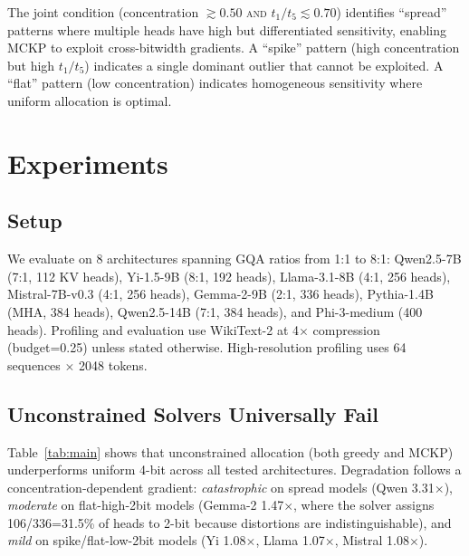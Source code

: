 \documentclass[11pt,a4paper]{article}
\begin{document}
The joint condition (concentration $\gtrsim 0.50$ \textsc{and} $t_1/t_5 \lesssim 0.70$) identifies ``spread'' patterns where multiple heads have high but differentiated sensitivity, enabling MCKP to exploit cross-bitwidth gradients.
A ``spike'' pattern (high concentration but high $t_1/t_5$) indicates a single dominant outlier that cannot be exploited.
A ``flat'' pattern (low concentration) indicates homogeneous sensitivity where uniform allocation is optimal.

\section{Experiments}
\label{sec:experiments}

\subsection{Setup}

We evaluate on 8 architectures spanning GQA ratios from 1:1 to 8:1: Qwen2.5-7B (7:1, 112 KV heads), Yi-1.5-9B (8:1, 192 heads), Llama-3.1-8B (4:1, 256 heads), Mistral-7B-v0.3 (4:1, 256 heads), Gemma-2-9B (2:1, 336 heads), Pythia-1.4B (MHA, 384 heads), Qwen2.5-14B (7:1, 384 heads), and Phi-3-medium (400 heads).
Profiling and evaluation use WikiText-2 at 4$\times$ compression (budget=0.25) unless stated otherwise.
High-resolution profiling uses 64 sequences $\times$ 2048 tokens.

\subsection{Unconstrained Solvers Universally Fail}
\label{sec:unconstrained}

Table~\ref{tab:main} shows that unconstrained allocation (both greedy and MCKP) underperforms uniform 4-bit across all tested architectures.
Degradation follows a concentration-dependent gradient:
\emph{catastrophic} on spread models (Qwen 3.31$\times$),
\emph{moderate} on flat-high-2bit models (Gemma-2 1.47$\times$, where the solver assigns 106/336=31.5\% of heads to 2-bit because distortions are indistinguishable),
and \emph{mild} on spike/flat-low-2bit models (Yi 1.08$\times$, Llama 1.07$\times$, Mistral 1.08$\times$).
\end{document}
